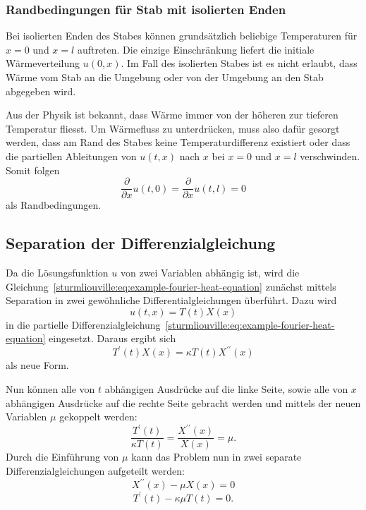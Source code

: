 %
%

\subsubsection{Randbedingungen für Stab mit isolierten Enden}

Bei isolierten Enden des Stabes können grundsätzlich beliebige Temperaturen für
$x = 0$ und $x = l$ auftreten.
Die einzige Einschränkung liefert die initiale Wärmeverteilung $u(0, x)$.
Im Fall des isolierten Stabes ist es nicht erlaubt, dass Wärme vom Stab
an die Umgebung oder von der Umgebung an den Stab abgegeben wird.

Aus der Physik ist bekannt, dass Wärme immer von der höheren zur tieferen
Temperatur fliesst. Um Wärmefluss zu unterdrücken, muss also dafür gesorgt
werden, dass am Rand des Stabes keine Temperaturdifferenz existiert oder 
dass die partiellen Ableitungen von $u(t,x)$ nach $x$ bei $x = 0$ und $x = l$
verschwinden.
Somit folgen
\begin{equation}
    \label{sturmliouville:eq:example-fourier-boundary-condition-ends-isolated}
    \frac{\partial}{\partial x} u(t, 0)
    =
    \frac{\partial}{\partial x} u(t, l)
    =
    0
\end{equation}
als Randbedingungen.

%
%

\subsection{Separation der Differenzialgleichung}

Da die Lösungsfunktion $u$ von zwei Variablen abhängig ist, wird die
Gleichung~\eqref{sturmliouville:eq:example-fourier-heat-equation} zunächst
mittels Separation in zwei gewöhnliche Differentialgleichungen überführt.
Dazu wird 
\[
    u(t,x)
    =
    T(t)X(x)
\]
in die partielle
Differenzialgleichung~\eqref{sturmliouville:eq:example-fourier-heat-equation}
eingesetzt.
Daraus ergibt sich 
\[
    T^{\prime}(t)X(x)
    =
    \kappa T(t)X^{\prime \prime}(x)
\]
als neue Form.

Nun können alle von $t$ abhängigen Ausdrücke auf die linke Seite, sowie alle
von $x$ abhängigen Ausdrücke auf die rechte Seite gebracht werden und mittels
der neuen Variablen $\mu$ gekoppelt werden:
\[
    \frac{T^{\prime}(t)}{\kappa T(t)}
    =
    \frac{X^{\prime \prime}(x)}{X(x)}
    =
    \mu.
\]
Durch die Einführung von $\mu$ kann das Problem nun in zwei separate
Differenzialgleichungen aufgeteilt werden:
\begin{equation}
    \label{sturmliouville:eq:example-fourier-separated-x}
    X^{\prime \prime}(x) - \mu X(x)
    =
    0
\end{equation}
\begin{equation}
    \label{sturmliouville:eq:example-fourier-separated-t}
    T^{\prime}(t) - \kappa \mu T(t)
    =
    0.
\end{equation}

